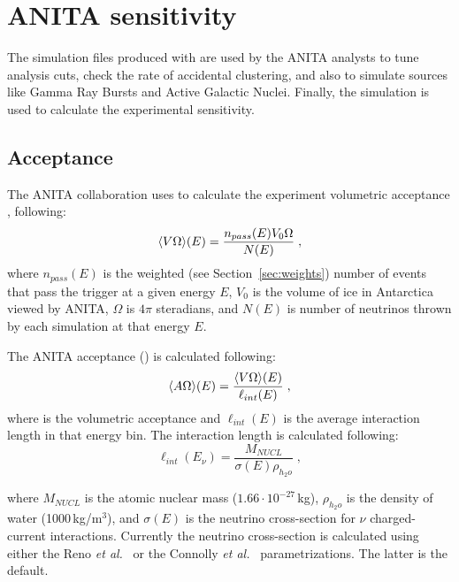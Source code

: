\section{ANITA sensitivity}
\label{sec:results}

The simulation files produced with \icemc are used by the ANITA analysts to tune analysis cuts, check the rate of accidental clustering, and also to simulate sources like Gamma Ray Bursts and Active Galactic Nuclei.
Finally, the simulation is used to calculate the experimental sensitivity.

\subsection{Acceptance}
\label{subsec:acceptance}
The ANITA collaboration uses \icemc to calculate the experiment volumetric acceptance \effvol, following:
\begin{equation}
  \label{eq:volacceptance}
  \langle V\Omega\rangle(E) = \dfrac{n_{{pass}}(E)V_0\Omega}{N(E)} \;,
\end{equation}
\noindent where
 $n_{{pass}}(E)$ is the weighted (see Section~\ref{sec:weights}) number of events that pass the trigger at a given energy $E$,
 $V_0$ is the volume of ice in Antarctica viewed by ANITA,
$\Omega$ is $4\pi$ steradians, and 
 $N(E)$ is number of neutrinos thrown by each simulation at that energy $E$.

The ANITA acceptance (\effarea) is calculated following:
\begin{equation}
  \label{eq:acceptance}
  \langle A\Omega\rangle(E) = \dfrac{\langle V\Omega\rangle(E)}{\ell_{{int}}(E)} \;,
\end{equation}
\noindent where
 \effvol is the volumetric acceptance and
 $\ell_{{int}}(E)$ is the average interaction length in that energy bin. 
The interaction length is calculated following:
 \begin{equation}
   \label{eq:intlength}
    \ell_{{int}}(E_\nu) =   \dfrac{M_{NUCL}}{\sigma(E) \rho_{h_2o} } \;,
  \end{equation}
  
\noindent where
 $M_{NUCL}$ is the atomic nuclear mass ($1.66\cdot 10^{-27}$\,kg),
 $\rho_{h_2o}$ is the density of water (1000\,kg/m$^3$), 
and $\sigma(E)$ is the neutrino cross-section for $\nu$ charged-current interactions.
Currently the neutrino cross-section is calculated using either the
Reno {\it et al.}~\cite{reno2005high}
or the Connolly {\it et al.}~\cite{PhysRevD.83.113009} parametrizations.
The latter is the default.

